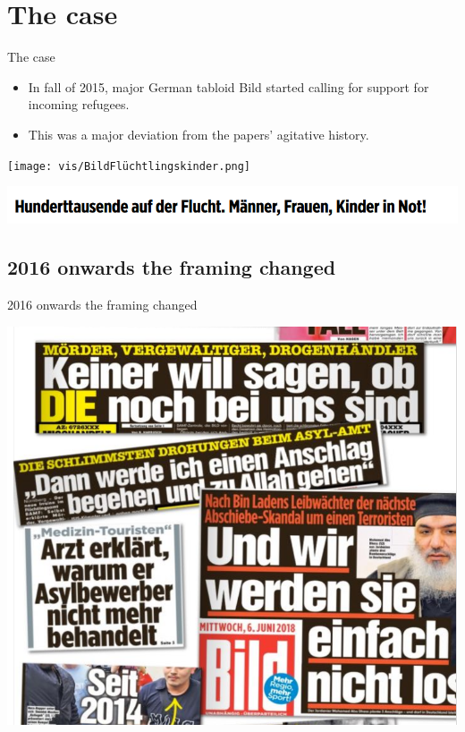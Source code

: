 \documentclass[
  ignorenonframetext,
]{beamer}
\providecommand{\tightlist}{%
  \setlength{\itemsep}{0pt}\setlength{\parskip}{0pt}}
\begin{document}
\hypertarget{the-case}{%
\section{The case}\label{the-case}}

\begin{frame}{The case}
\begin{itemize}
\tightlist
\item
  In fall of 2015, major German tabloid Bild started calling for support
  for incoming refugees.
\item
  This was a major deviation from the papers' agitative history.
\end{itemize}

\texttt{[image: vis/BildFlüchtlingskinder.png]}

\includegraphics{vis/BildNot.png}
\end{frame}

\hypertarget{onwards-the-framing-changed}{%
\subsection{2016 onwards the framing
changed}\label{onwards-the-framing-changed}}

\begin{frame}{2016 onwards the framing changed}
\center

\includegraphics[width=\textwidth,height=0.5\textheight]{vis/UebermedienBild2.png}
\end{frame}
\end{document}
